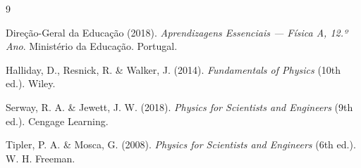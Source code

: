 \documentclass[12pt,a4paper]{article}
\begin{document}
	\begin{thebibliography}{9}
		
		Direção-Geral da Educação (2018).
		\textit{Aprendizagens Essenciais — Física A, 12.º Ano}.
		Ministério da Educação. Portugal.
		
		Halliday, D., Resnick, R. \& Walker, J. (2014).
		\textit{Fundamentals of Physics} (10th ed.).
		Wiley.
		
		Serway, R. A. \& Jewett, J. W. (2018).
		\textit{Physics for Scientists and Engineers} (9th ed.).
		Cengage Learning.
		
		Tipler, P. A. \& Mosca, G. (2008).
		\textit{Physics for Scientists and Engineers} (6th ed.).
		W. H. Freeman.
		
	\end{thebibliography}
	
\end{document}
